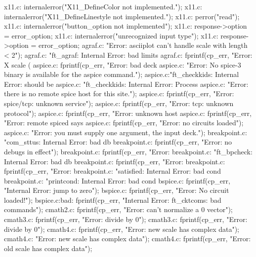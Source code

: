 {{{{{{x11.c:	internalerror("X11_DefineColor not implemented.");
x11.c:	internalerror("X11_DefineLinestyle not implemented.");
x11.c:	    perror("read");
x11.c:	    internalerror("button_option not implemented");
x11.c:	    response->option = error_option;
x11.c:	    internalerror("unrecognized input type");
x11.c:	    response->option = error_option;
agraf.c:            "Error: asciiplot can't handle scale with length < 2\n");
agraf.c:    "ft_agraf: Internal Error: bad limits %
agraf.c:            fprintf(cp_err, "Error: X scale (%
aspice.c:        fprintf(cp_err, "Error: bad deck %
aspice.c:    "Error: No spice-3 binary is available for the aspice command.\n");
aspice.c:"ft_checkkids: Internal Error: should be %
aspice.c:            "ft_checkkids: Internal Error: Process %
aspice.c:        "Error: there is no remote spice host for this site.\n");
aspice.c:        fprintf(cp_err, "Error: spice/tcp: unknown service\n");
aspice.c:        fprintf(cp_err, "Error: tcp: unknown protocol\n");
aspice.c:        fprintf(cp_err, "Error: unknown host %
aspice.c:        fprintf(cp_err, "Error: remote spiced says %
aspice.c:            fprintf(cp_err, "Error: no circuits loaded\n");
aspice.c:        "Error: you must supply one argument, the input deck.\n");
breakpoint.c:                "com_sttus: Internal Error: bad db %
breakpoint.c:            fprintf(cp_err, "Error: no debugs in effect\n");
breakpoint.c:                fprintf(cp_err, "Error: %
breakpoint.c:                "ft_bpcheck: Internal Error: bad db %
breakpoint.c:            fprintf(cp_err, "Error: %
breakpoint.c:            fprintf(cp_err, "Error: %
breakpoint.c:                "satisfied: Internal Error: bad cond %
breakpoint.c:                "printcond: Internal Error: bad cond %
bspice.c:        fprintf(cp_err, "Internal Error: jump to zero\n");
bspice.c:            fprintf(cp_err, "Error: No circuit loaded!\n");
bspice.c:bad:    fprintf(cp_err, "Internal Error: ft_cktcoms: bad commands\n");
cmath2.c:        fprintf(cp_err, "Error: can't normalize a 0 vector\n");
cmath3.c:            fprintf(cp_err, "Error: divide by 0\n");
cmath3.c:            fprintf(cp_err, "Error: divide by 0\n");
cmath4.c:        fprintf(cp_err, "Error: new scale has complex data\n");
cmath4.c:                    "Error: new scale has complex data\n");
cmath4.c:        fprintf(cp_err, "Error: old scale has complex data\n");
}}}}}}
